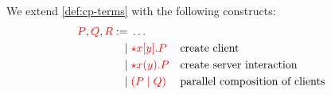 \begin{definition}[Terms]\label{def:nc-terms}
  We extend \cref{def:cp-terms} with the following constructs:
  \[\!
    \begin{aligned}
      \textcolor{red}{P}, \textcolor{red}{Q}, \textcolor{red}{R}
           :=& \; \dots
      \\ \mid& \; \textcolor{red}{{\star}{x}[y].P} &&\text{create client}
      \\ \mid& \; \textcolor{red}{{\star}{x}(y).P} &&\text{create server interaction}
      \\ \mid& \; \textcolor{red}{(P \mid Q)}   &&\text{parallel composition of clients}
    \end{aligned}
  \]
\end{definition}
